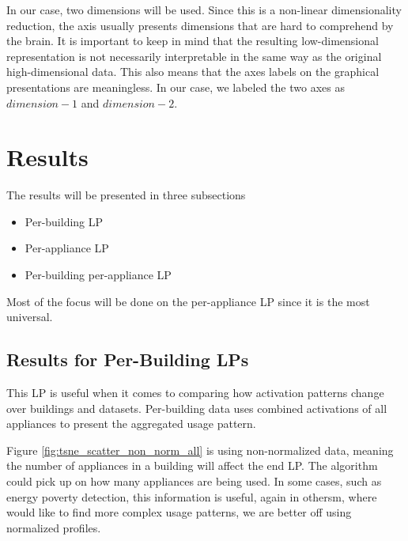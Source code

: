 In our case, two dimensions will be used. Since this is a non-linear dimensionality reduction,
the axis usually presents dimensions that are hard to comprehend by the brain. 
It is important to keep in mind that the resulting low-dimensional representation is not necessarily interpretable in the same way as the original high-dimensional data.
This also means that the axes labels on the graphical presentations are meaningless.
In our case, we labeled the two axes as $dimension-1$ and $dimension-2$.

\section{Results}

The results will be presented in three subsections

\begin{itemize}
	\item Per-building LP
	\item Per-appliance LP
	\item Per-building per-appliance LP
\end{itemize}

Most of the focus will be done on the per-appliance LP since it is the most universal.

\subsection{Results for Per-Building LPs}
\label{ssec:res_pb_lp}
This LP is useful when it comes to comparing how 
activation patterns change over buildings and datasets.
Per-building data uses combined activations of all appliances to present 
the aggregated usage pattern.  

Figure \ref{fig:tsne_scatter_non_norm_all} is using non-normalized data, meaning
the number of appliances in a building will affect the end LP.
The algorithm could pick up on how many appliances are being used.
In some cases, such as energy poverty detection, this information is useful, 
again in othersm, where would like to find more complex usage patterns, we are better off using normalized profiles.

